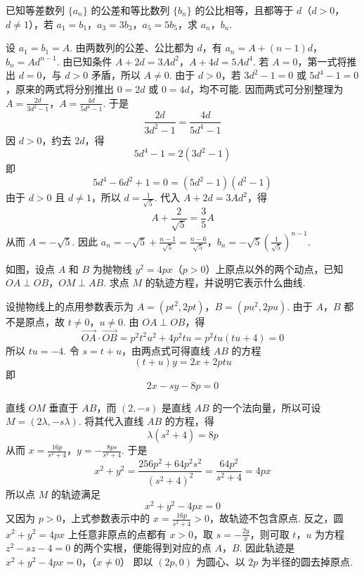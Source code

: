 \FloatBarrier

\begin{problem}
已知等差数列 \(\{a_n\}\) 的公差和等比数列 \(\{b_n\}\) 的公比相等，且都等于 \(d\)（\(d>0\)，\(d\neq1\)），若 \(a_1=b_1\)，\(a_3=3b_3\)，\(a_5=5b_5\)，求 \(a_n\)，\(b_n\).
\end{problem}

\begin{solution}
设 \(a_1=b_1=A\). 由两数列的公差、公比都为 \(d\)，有
\(a_n=A+(n-1)d\)，\(b_n=A d^{n-1}\).
由已知条件
\(A+2d=3Ad^2\)，\(A+4d=5Ad^4\).
若 \(A=0\)，第一式将推出 \(d=0\)，与 \(d>0\) 矛盾，所以 \(A\neq0\). 由于 \(d>0\)，若 \(3d^2-1=0\) 或 \(5d^4-1=0\)，原来的两式将分别推出 \(0=2d\) 或 \(0=4d\)，均不可能. 因而两式可分别整理为
\(A=\frac{2d}{3d^2-1}\)，\(A=\frac{4d}{5d^4-1}\).
于是
\[
\frac{2d}{3d^2-1}=\frac{4d}{5d^4-1}
\]
因 \(d>0\)，约去 \(2d\)，得
\[
5d^4-1=2\left(3d^2-1\right)
\]
即
\[
5d^4-6d^2+1=0=(5d^2-1)(d^2-1)
\]
由于 \(d>0\) 且 \(d\neq1\)，所以 \(d=\frac1{\sqrt5}\). 代入 \(A+2d=3Ad^2\)，得
\[
A+\frac2{\sqrt5}=\frac35A
\]
从而 \(A=-\sqrt5\). 因此
\(a_n=-\sqrt5+\frac{n-1}{\sqrt5}=\frac{n-6}{\sqrt5}\)，\(b_n=-\sqrt5\left(\frac1{\sqrt5}\right)^{n-1}\).
\end{solution}

\begin{problem}
如图，设点 \(A\) 和 \(B\) 为抛物线 \(y^2=4px\)（\(p>0\)）上原点以外的两个动点，已知 \(OA\perp OB\)，\(OM\perp AB\). 求点 \(M\) 的轨迹方程，并说明它表示什么曲线.

\end{problem}

\FloatBarrier

\begin{solution}
设抛物线上的点用参数表示为
\(A=(pt^2,2pt)\)，\(B=(pu^2,2pu)\).
由于 \(A\)，\(B\) 都不是原点，故 \(t\neq0\)，\(u\neq0\). 由 \(OA\perp OB\)，得
\[
\overrightarrow{OA}\cdot\overrightarrow{OB}=p^2t^2u^2+4p^2tu=p^2tu\left(tu+4\right)=0
\]
所以 \(tu=-4\). 令 \(s=t+u\)，由两点式可得直线 \(AB\) 的方程
\[
(t+u)y=2x+2ptu
\]
即
\[
2x-sy-8p=0
\]

直线 \(OM\) 垂直于 \(AB\)，而 \((2,-s)\) 是直线 \(AB\) 的一个法向量，所以可设 \(M=\left(2\lambda,-s\lambda\right)\). 将其代入直线 \(AB\) 的方程，得
\[
\lambda\left(s^2+4\right)=8p
\]
从而
\(x=\frac{16p}{s^2+4}\)，\(y=-\frac{8ps}{s^2+4}\).
于是
\[
x^2+y^2=\frac{256p^2+64p^2s^2}{\left(s^2+4\right)^2}=\frac{64p^2}{s^2+4}=4px
\]
所以点 \(M\) 的轨迹满足
\[
x^2+y^2-4px=0
\]
又因为 \(p>0\)，上式参数表示中的 \(x=\frac{16p}{s^2+4}>0\)，故轨迹不包含原点. 反之，圆 \(x^2+y^2=4px\) 上任意非原点的点都有 \(x>0\)，取 \(s=-\frac{2y}{x}\)，则可取 \(t\)，\(u\) 为方程 \(z^2-sz-4=0\) 的两个实根，便能得到对应的点 \(A\)，\(B\). 因此轨迹是
\(x^2+y^2-4px=0\)，（\(x\neq0\)）
即以 \((2p,0)\) 为圆心、以 \(2p\) 为半径的圆去掉原点.
\end{solution}


